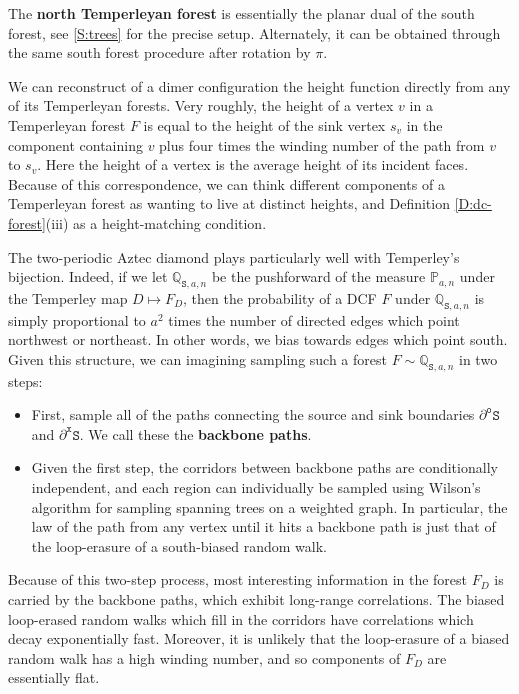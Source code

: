\documentclass[11pt,twoside]{amsart}
\theoremstyle{plain}
\numberwithin{quest}{section}
\theoremstyle{remark}
\numberwithin{rem}{section}
\theoremstyle{definition}
\renewcommand{\P}{\mathbb{P}}
\renewcommand{\tt}[1]{{\mathtt{#1}}}
\begin{document}
    The \textbf{north Temperleyan forest} is essentially the planar dual of the south forest, see \cref{S:trees} for the precise setup. Alternately, it can be obtained through the same south forest procedure after rotation by $\pi$.
	
	We can reconstruct of a dimer configuration the height function directly from any of its Temperleyan forests. Very roughly, the height of a vertex $v$ in a Temperleyan forest $F$ is equal to the height of the sink vertex $s_v$ in the component containing $v$ plus four times the winding number of the path from $v$ to $s_v$. Here the height of a vertex is the average height of its incident faces. Because of this correspondence, we can think different components of a Temperleyan forest as wanting to live at distinct heights, and Definition \ref{D:dc-forest}(iii) as a height-matching condition.
	
	The two-periodic Aztec diamond plays particularly well with Temperley's bijection. Indeed, if we let $\mathbb{Q}_{\tt{S}, a, n}$ be the pushforward of the measure $\P_{a, n}$ under the Temperley map $D \mapsto F_D$, then the probability of a DCF $F$ under $\mathbb{Q}_{\tt{S}, a, n}$ is simply proportional to $a^2$ times the number of directed edges which point northwest or northeast. In other words, we bias towards edges which point south. Given this structure, we can imagining sampling such a forest $F \sim \mathbb{Q}_{\tt{S}, a, n}$ in two steps:
	\begin{itemize}
		\item First, sample all of the paths connecting the source and sink boundaries $\partial^{\tt{o}} \mathtt{S}$ and $\partial^{\tt{x}} \mathtt{S}$. We call these the \textbf{backbone paths}.
		\item Given the first step, the corridors between backbone paths are conditionally independent, and each region can individually be sampled using Wilson's algorithm for sampling spanning trees on a weighted graph. In particular, the law of the path from any vertex until it hits a backbone path is just that of the loop-erasure of a south-biased random walk.
	\end{itemize}
	Because of this two-step process, most interesting information in the forest $F_D$ is carried by the backbone paths, which exhibit long-range correlations. The biased loop-erased random walks which fill in the corridors have correlations which decay exponentially fast. Moreover, it is unlikely that the loop-erasure of a biased random walk has a high winding number, and so components of $F_D$ are essentially flat. 
    
\end{document}
